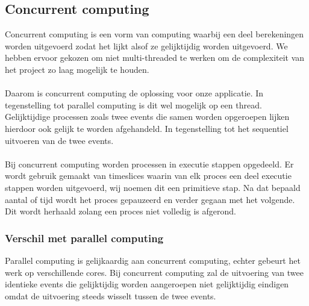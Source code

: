 \documentclass[]{article}
\begin{document}
\subsection{Concurrent computing }
Concurrent computing \cite{concurrent} is een vorm van computing waarbij een deel berekeningen worden uitgevoerd zodat het lijkt alsof ze gelijktijdig worden uitgevoerd. We hebben ervoor gekozen om niet multi-threaded te werken om de complexiteit van het project zo laag mogelijk te houden.\\\\ Daarom is concurrent computing de oplossing voor onze applicatie. In tegenstelling tot parallel computing is dit wel mogelijk op een thread. Gelijktijdige processen zoals twee events die samen worden opgeroepen lijken hierdoor ook gelijk te worden afgehandeld. In tegenstelling tot het sequentiel uitvoeren van de twee events.\\\\
Bij concurrent computing worden processen in executie stappen opgedeeld. Er wordt gebruik gemaakt van timeslices waarin van elk proces een deel executie stappen worden uitgevoerd, wij noemen dit een primitieve stap. Na dat bepaald aantal of tijd wordt het proces gepauzeerd en verder gegaan met het volgende. Dit wordt herhaald zolang een proces niet volledig is afgerond.
\subsubsection{Verschil met parallel computing}
Parallel computing is gelijkaardig aan concurrent computing, echter gebeurt het werk op verschillende cores. Bij concurrent computing zal de uitvoering van twee identieke events die gelijktijdig worden aangeroepen niet gelijktijdig eindigen omdat de uitvoering steeds wisselt tussen de twee events. 
\end{document}
